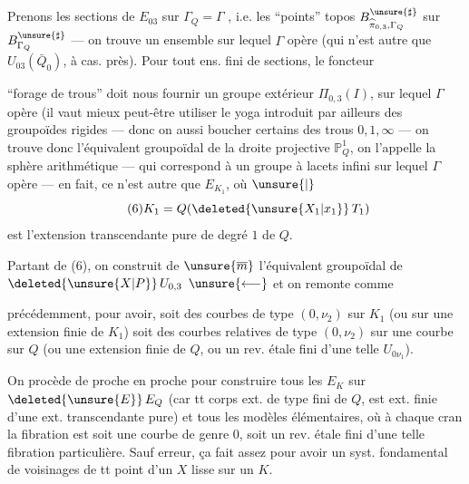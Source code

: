 Prenons les  sections de $E_{03}$ sur $\Gamma_Q=\Gamma$ , i.e. les ``points''   topos $B_{\widehat\pi_{0,3},\Gamma_Q}^{\unsure{\sharp}}$ sur $B_{\Gamma_Q}^{\unsure{\sharp}}$ — on trouve un ensemble sur lequel $\Gamma$ opère (qui n'est autre que $U_{03}(\bar Q_0)$, à  cas. près). Pour tout ens. fini  de sections,  le foncteur

``forage de trous'' doit nous fournir un groupe extérieur $\Pi_{0,3}(I)$,  sur lequel $\Gamma$ opère (il vaut mieux peut-être utiliser le yoga introduit par ailleurs des groupoïdes rigides — donc on   aussi boucher certains des trous $0,1,\infty$ — on trouve donc l'équivalent groupoïdal de la  droite projective $\mathbb P^1_Q$, on l'appelle la sphère arithmétique — qui correspond à un groupe  à lacets infini sur lequel $\Gamma$ opère — en fait, ce n'est autre que $E_{K_1}$, où $\unsure{\vert}$
\[
\tag{6}K_1=Q(\deleted{\unsure{X_1|x_1}}\,T_1)
\]
est l'extension transcendante pure  de degré $1$ de $Q$.

Partant de (6), on construit de $\unsure{\overline m}$ l'équivalent groupoïdal de $\deleted{\unsure{X|P}}\,U_{0,3}$ $\unsure{\longleftarrow}$ et on remonte comme

précédemment, pour avoir, soit des courbes de type $(0,\nu_2)$ sur $K_1$\unsure{,} (ou sur une extension finie de $K_1$) soit des courbes relatives de type $(0,\nu_2)$ sur une courbe sur $Q$  (ou une extension finie de $Q$, ou un rev.  étale fini d'une telle $U_{0\nu_1}$).

On procède de proche en proche pour construire  tous les $E_K$ sur $\deleted{\unsure{E}}\,E_Q$ (car tt corps ext. de type fini de $Q$, est ext. finie d'une ext. transcendante pure) et tous les modèles élémentaires, où à chaque cran la fibration est soit une courbe de genre $0$, soit un rev. étale fini d'une telle fibration particulière. Sauf erreur, ça fait assez pour avoir un syst. fondamental de voisinages de tt point d'un $X$ lisse sur un $K$.

